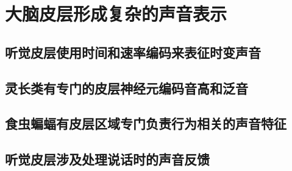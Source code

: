 \section{大脑皮层形成复杂的声音表示}

\subsection{听觉皮层使用时间和速率编码来表征时变声音}

\subsection{灵长类有专门的皮层神经元编码音高和泛音}

\subsection{食虫蝙蝠有皮层区域专门负责行为相关的声音特征}

\subsection{听觉皮层涉及处理说话时的声音反馈}